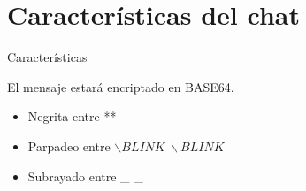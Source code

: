 \section{Características del chat}



\begin{frame}{Características}
	\begin{block}{ }
		El mensaje estará encriptado en BASE64.
	\end{block}
	
	\begin{block}{ }
		\begin{itemize}
			\item Negrita entre **
			\item Parpadeo entre $\backslash BLINK \ \backslash BLINK$
			\item Subrayado entre \_ \_
		\end{itemize}
	\end{block}

\end{frame}